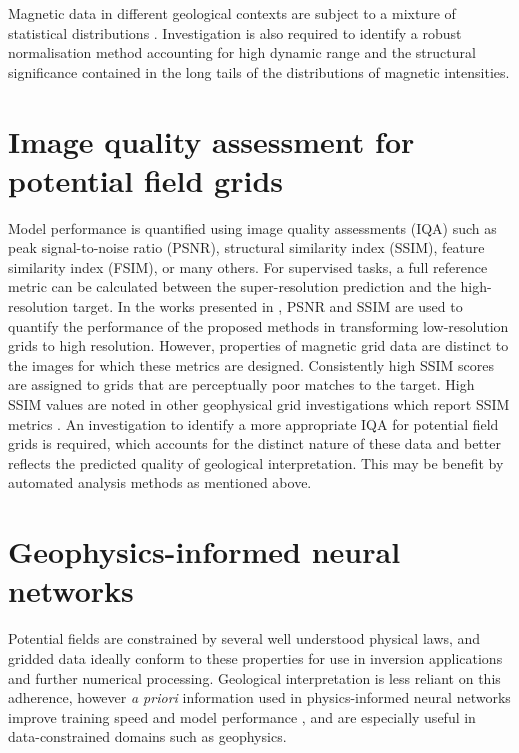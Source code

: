 Magnetic data in different geological contexts are subject to a mixture of statistical distributions \parencite{khokhlovCauseNonGaussianDistribution2017}. Investigation is also required to identify a robust normalisation method accounting for high dynamic range and the structural significance contained in the long tails of the distributions of magnetic intensities.

\section{Image quality assessment for potential field grids}
Model performance is quantified using image quality assessments (IQA) such as peak signal-to-noise ratio (PSNR), structural similarity index (SSIM), feature similarity index (FSIM), or many others.
For supervised tasks, a full reference metric can be calculated between the super-resolution prediction and the high-resolution target.
In the works presented in , PSNR and SSIM are used to quantify the performance of the proposed methods in transforming low-resolution grids to high resolution.
However, properties of magnetic grid data are distinct to the images for which these metrics are designed.
Consistently high SSIM scores are assigned to grids that are perceptually poor matches to the target.
High SSIM values are noted in other geophysical grid investigations which report SSIM metrics \parencite{wangDeeplearningbasedSeismicData2018,bavandsavadkoohiHighresolutionAeromagneticMap2023}.
An investigation to identify a more appropriate IQA for potential field grids is required, which accounts for the distinct nature of these data and better reflects the predicted quality of geological interpretation.
This may be benefit by automated analysis methods as mentioned above.

\section{Geophysics-informed neural networks}
Potential fields are constrained by several well understood physical laws, and gridded data ideally conform to these properties for use in inversion applications and further numerical processing.
Geological interpretation is less reliant on this adherence, however \emph{a priori} information used in physics-informed neural networks improve training speed and model performance \parencite{raissiPhysicsinformedNeuralNetworks2019}, and are especially useful in data-constrained domains such as geophysics.

